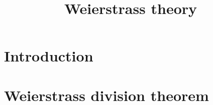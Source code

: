






\title{Weierstrass theory}







\maketitle


\tableofcontents



\section{Introduction}\label{sec-introduction}

\section{Weierstrass division theorem}



\cite{stacks-project}

\printbibliography
